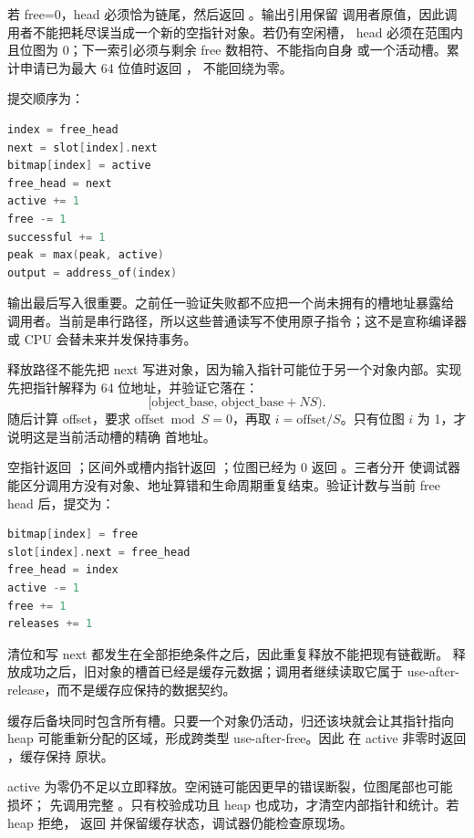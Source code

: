 若 free=0，head 必须恰为链尾，然后返回 。输出引用保留
调用者原值，因此调用者不能把耗尽误当成一个新的空指针对象。若仍有空闲槽，
head 必须在范围内且位图为 0；下一索引必须与剩余 free 数相符、不能指向自身
或一个活动槽。累计申请已为最大 64 位值时返回 ，
不能回绕为零。

提交顺序为：

\begin{lstlisting}[language=C++]
index = free_head
next = slot[index].next
bitmap[index] = active
free_head = next
active += 1
free -= 1
successful += 1
peak = max(peak, active)
output = address_of(index)
\end{lstlisting}

输出最后写入很重要。之前任一验证失败都不应把一个尚未拥有的槽地址暴露给
调用者。当前是串行路径，所以这些普通读写不使用原子指令；这不是宣称编译器
或 CPU 会替未来并发保持事务。

释放路径不能先把 next 写进对象，因为输入指针可能位于另一个对象内部。实现
先把指针解释为 64 位地址，并验证它落在：
\[
  [\mathrm{object\_base},\,
    \mathrm{object\_base}+N S).
\]
随后计算 offset，要求 \(\mathrm{offset}\bmod S=0\)，再取
\(i=\mathrm{offset}/S\)。只有位图 \(i\) 为 1，才说明这是当前活动槽的精确
首地址。

空指针返回 ；区间外或槽内指针返回
；位图已经为 0 返回 。三者分开
使调试器能区分调用方没有对象、地址算错和生命周期重复结束。验证计数与当前
free head 后，提交为：

\begin{lstlisting}[language=C++]
bitmap[index] = free
slot[index].next = free_head
free_head = index
active -= 1
free += 1
releases += 1
\end{lstlisting}

清位和写 next 都发生在全部拒绝条件之后，因此重复释放不能把现有链截断。
释放成功之后，旧对象的槽首已经是缓存元数据；调用者继续读取它属于 use-after-
release，而不是缓存应保持的数据契约。

缓存后备块同时包含所有槽。只要一个对象仍活动，归还该块就会让其指针指向
heap 可能重新分配的区域，形成跨类型 use-after-free。因此
 在 active 非零时返回 ，缓存保持
原状。

active 为零仍不足以立即释放。空闲链可能因更早的错误断裂，位图尾部也可能
损坏； 先调用完整 。只有校验成功且 heap
 也成功，才清空内部指针和统计。若 heap 拒绝，
返回  并保留缓存状态，调试器仍能检查原现场。

